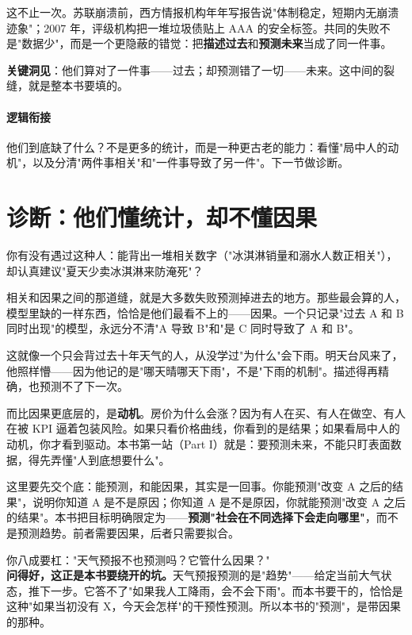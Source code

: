 \documentclass[../../main2.tex]{subfiles}
\begin{document}
	这不止一次。苏联崩溃前，西方情报机构年年写报告说"体制稳定，短期内无崩溃迹象"；2007 年，评级机构把一堆垃圾债贴上 AAA 的安全标签。共同的失败不是"数据少"，而是一个更隐蔽的错觉：把\textbf{描述过去}和\textbf{预测未来}当成了同一件事。

	\textbf{\Large 关键洞见}：他们算对了一件事——过去；却预测错了一切——未来。这中间的裂缝，就是整本书要填的。

	\paragraph*{逻辑衔接}
	他们到底缺了什么？不是更多的统计，而是一种更古老的能力：看懂"局中人的动机"，以及分清"两件事相关"和"一件事导致了另一件"。下一节做诊断。

	\section{诊断：他们懂统计，却不懂因果}

	你有没有遇过这种人：能背出一堆相关数字（"冰淇淋销量和溺水人数正相关"），却认真建议"夏天少卖冰淇淋来防淹死"？

	相关和因果之间的那道缝，就是大多数失败预测掉进去的地方。那些最会算的人，模型里缺的一样东西，恰恰是他们最看不上的——因果。一个只记录"过去 A 和 B 同时出现"的模型，永远分不清"A 导致 B"和"是 C 同时导致了 A 和 B"。

	\begin{tcolorbox}[colback=green!5, title=\textit{生活类比}]
		这就像一个只会背过去十年天气的人，从没学过"为什么"会下雨。明天台风来了，他照样懵——因为他记的是"哪天晴哪天下雨"，不是"下雨的机制"。描述得再精确，也预测不了下一次。
	\end{tcolorbox}

	而比因果更底层的，是\textbf{动机}。房价为什么会涨？因为有人在买、有人在做空、有人在被 KPI 逼着包装风险。如果只看价格曲线，你看到的是结果；如果看局中人的动机，你才看到驱动。本书第一站（Part I）就是：要预测未来，不能只盯表面数据，得先弄懂"人到底想要什么"。

	这里要先交个底：能预测，和能因果，其实是一回事。你能预测"改变 A 之后的结果"，说明你知道 A 是不是原因；你知道 A 是不是原因，你就能预测"改变 A 之后的结果"。本书把目标明确限定为——\textbf{预测"社会在不同选择下会走向哪里"}，而不是预测趋势。前者需要因果，后者只需要拟合。

	\begin{tcolorbox}[colback=yellow!5, title=\textit{读者行为预测}]
		你八成要杠："天气预报不也预测吗？它管什么因果？"\\
		\textbf{问得好，这正是本书要绕开的坑。}天气预报预测的是"趋势"——给定当前大气状态，推下一步。它答不了"如果我人工降雨，会不会下雨"。而本书要干的，恰恰是这种"如果当初没有 X，今天会怎样"的干预性预测。所以本书的"预测"，是带因果的那种。
	\end{tcolorbox}
\end{document}
